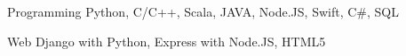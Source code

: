 


\begin{cvskills}


\cvskill
{Programming} %
{Python, C/C++, Scala, JAVA, Node.JS, Swift, C\#, SQL} %


\cvskill
{Web} %
{Django with Python, Express with Node.JS, HTML5} %



\end{cvskills}
